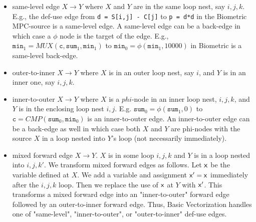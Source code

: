 \documentclass[sigconf, screen, natbib=false, dvipsnames, table]{acmart}
\theoremstyle{definition}
\begin{document}
\begin{itemize}
\item same-level edge $X\rightarrow Y$ where $X$ and $Y$ are in the same loop nest, say $i,j,k$. E.g., the def-use edge from \texttt{d = S[i,j] - C[j]} to \texttt{p = d*d} in the Biometric MPC-source is a same-level edge. A same-level edge can be a back-edge in which case a $\phi$ node is the target of the edge. E.g., $\texttt{min}_1 = \mathit{MUX}(\texttt{c},\texttt{sum}_1,\texttt{min}_1)$ to $\texttt{min}_0 = \phi(\texttt{min}_1, 10000)$ in Biometric is a same-level back-edge.
\item outer-to-inner $X\rightarrow Y$ where $X$ is in an outer loop nest, say $i$, and $Y$ is in an inner one, say $i,j,k$. 
\item inner-to-outer $X\rightarrow Y$ where $X$ is a $phi$-node in an inner loop nest, $i,j,k$, and $Y$ is in the enclosing loop nest $i,j$. E.g. $\texttt{sum}_0 = \phi(\texttt{sum}_1, 0)$ to $\texttt{c} = \mathit{CMP}(\texttt{sum}_0,\texttt{min}_0)$ is an inner-to-outer edge. An inner-to-outer edge can be a back-edge as well in which case both $X$ and $Y$ are phi-nodes with the source $X$ in a loop nested into $Y$'s loop (not necessarily immediately).


\item mixed forward edge $X\rightarrow Y$. $X$ is in some loop $i,j,k$ and $Y$ is in a loop nested into $i,j,k'$. We transform mixed forward edges as follows. Let ${\sf {x}}$ be the variable defined at $X$. We add a variable and assignment ${\sf {x}}' = {\sf {x}}$ immediately after the $i,j,k$ loop. Then we replace the use of ${\sf {x}}$ at $Y$ with ${\sf {x}}'$. This transforms a mixed forward edge into an "inner-to-outer" forward edge followed by an outer-to-inner forward edge. Thus, Basic Vectorization handles one of "same-level", "inner-to-outer", or "outer-to-inner" def-use edges.
 \end{itemize}
\end{document}
